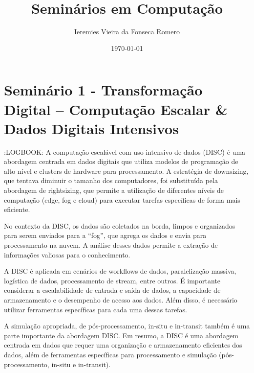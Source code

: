 \documentclass[11pt]{article}
\author{Ieremies Vieira da Fonseca Romero}
\date{\today}
\title{Seminários em Computação}
\begin{document}
\maketitle
\tableofcontents

\section{Seminário 1 - Transformação Digital – Computação Escalar \& Dados Digitais Intensivos}
\label{sec:orgbef36ed}
:LOGBOOK:
A computação escalável com uso intensivo de dados (DISC) é uma abordagem centrada em dados digitais que utiliza modelos de programação de alto nível e clusters de hardware para processamento. A estratégia de downsizing, que tentava diminuir o tamanho dos computadores, foi substituída pela abordagem de rightsizing, que permite a utilização de diferentes níveis de computação (edge, fog e cloud) para executar tarefas específicas de forma mais eficiente.

No contexto da DISC, os dados são coletados na borda, limpos e organizados para serem enviados para a “fog”, que agrega os dados e envia para processamento na nuvem. A análise desses dados permite a extração de informações valiosas para o conhecimento.

A DISC é aplicada em cenários de workflows de dados, paralelização massiva, logística de dados, processamento de stream, entre outros. É importante considerar a escalabilidade de entrada e saída de dados, a capacidade de armazenamento e o desempenho de acesso aos dados. Além disso, é necessário utilizar ferramentas específicas para cada uma dessas tarefas.

A simulação apropriada, de pós-processamento, in-situ e in-transit também é uma parte importante da abordagem DISC. Em resumo, a DISC é uma abordagem centrada em dados que requer uma organização e armazenamento eficientes dos dados, além de ferramentas específicas para processamento e simulação (pós-processamento, in-situ e in-transit).
\end{document}
